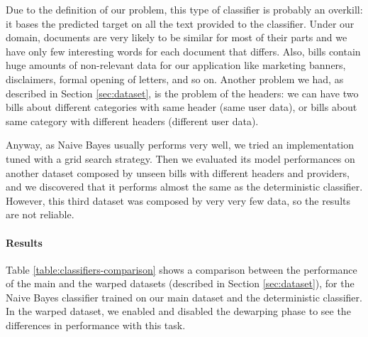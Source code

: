 \documentclass[10pt,twocolumn,letterpaper]{article}
\begin{document}
Due to the definition of our problem, this type of classifier
is probably an overkill: it bases the predicted target on all the
text provided to the classifier. Under our domain, documents are very
likely to be similar for most of their parts and we have only few
interesting words for each document that differs. Also, bills contain
huge amounts of non-relevant data for our application like marketing
banners, disclaimers, formal opening of letters, and so on. Another
problem we had, as described in Section \ref{sec:dataset}, is the
problem of the headers: we can have two bills about different
categories with same header (same user data), or bills about same
category with different headers (different user data).

Anyway, as Naive Bayes usually performs very well, we tried an
implementation tuned with a grid search strategy. Then we evaluated
its model performances on another dataset composed by unseen bills
with different headers and providers, and we discovered that it
performs almost the same as the deterministic classifier.  However,
this third dataset was composed by very very few
data, so the results are not reliable.

\paragraph{Results}

Table \ref{table:classifiers-comparison} shows a comparison
between the performance of the main and the warped datasets (described
in Section \ref{sec:dataset}), for the Naive Bayes classifier trained
on our main dataset and the deterministic classifier. In the warped
dataset, we enabled and disabled the dewarping phase to see the
differences in performance with this task.
\end{document}
